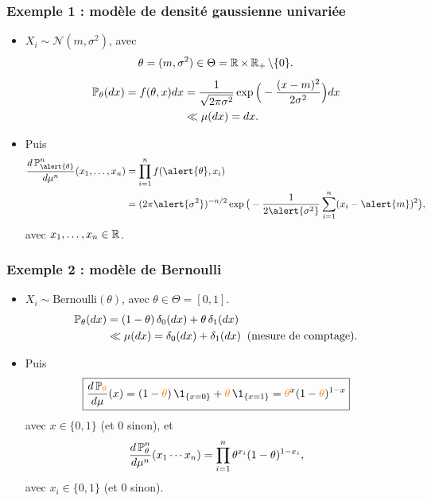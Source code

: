 \begin{frame}
\frametitle{Exemple 1 : modèle de densité gaussienne univariée}
\begin{itemize}
\item $X_i\sim {\mathcal N}(m,\sigma^2)$,
avec
$$\theta = (m,\sigma^2) \in \Theta = \operatorname{{\mathbb R}}\times \operatorname{{\mathbb R}}_+\setminus\{0\}.$$
\begin{align*}
\operatorname{{\mathbb P}}_\theta(dx) = f(\theta,x)dx & =\frac{1}{\sqrt{2\pi \sigma^2}}\exp\Big(-\frac{(x-m)^2}{2\sigma^2}\Big)dx \\
& \ll \mu(dx)=dx.
\end{align*}
\item Puis
\begin{align*}
\frac{d\PP_{\alert{\theta}}^n}{d\mu^n}(x_1,\ldots, x_n) & = \prod_{i = 1}^n f(\alert{\theta},x_i) \\
& =(2\pi \alert{\sigma^2})^{-n/2}\exp\big(-\frac{1}{2\alert{\sigma^2}}\sum_{i = 1}^n (x_i-\alert{m})^2\big),
\end{align*}
avec $x_1,\ldots,x_n \in \operatorname{{\mathbb R}}$.
\end{itemize}
\end{frame}

\begin{frame}
\frametitle{Exemple 2 :  modèle de Bernoulli}
\begin{itemize}
\item $X_i \sim \text{Bernoulli}(\theta)$, avec $\theta \in \Theta = [0,1]$.
\begin{align*}
\operatorname{{\mathbb P}}_\theta(dx)& = (1-\theta)\, \delta_{0}(dx) + \theta\, \delta_1(dx) \\
& \ll \mu(dx) = \delta_0(dx)+\delta_1(dx)\;\;\text{(mesure de comptage)}.
\end{align*}
\item Puis
$$\boxed{\frac{d\PP_{\tco{\theta}}}{d\mu}(x) = (1-\tco{\theta})\,\1_{\{x=0\}}+\tco{\theta}\,\1_{\{x=1\}} = \tco{\theta}^x(1-\tco{\theta})^{1-x}}
$$
\alert{avec $x\in \{0,1\}$} (et $0$ sinon), et
$$\frac{d\operatorname{{\mathbb P}}_\theta^n}{d\mu^n}(x_1\cdots x_n) = \prod_{i = 1}^n \theta^{x_i}(1-\theta)^{1-x_i},$$
\alert{avec $x_i \in \{0,1\}$} (et $0$ sinon).
\end{itemize}
\end{frame}


